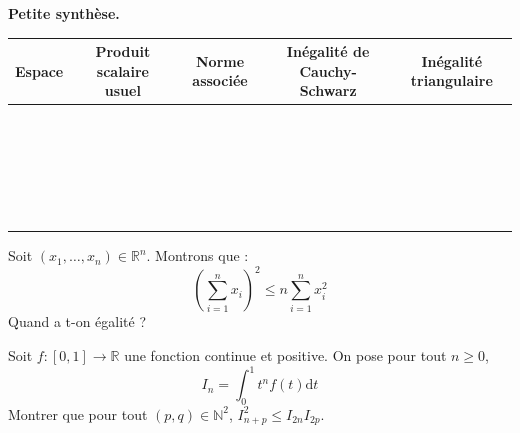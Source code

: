 \documentclass[french,11pt,twoside]{VcCours}
\newcommand{\dt}{\text{d}t}
\begin{document}
\begin{center}
\textbf{Petite synthèse.}
\end{center}

\begin{tabular}{|c|c|c|c|c|}
\hline
Espace & Produit scalaire usuel & Norme associée & Inégalité de Cauchy-Schwarz & Inégalité triangulaire \\
\hline
& & & & \\
& & & & \\
& & & & \\
& & & & \\
& & & & \\
& & & & \\
\hline
& & & & \\
& & & & \\
& & & & \\
& & & & \\
& & & & \\
& & & & \\
\hline
& & & & \\
& & & & \\
& & & & \\
& & & & \\
& & & & \\
& & & & \\
\hline
& & & & \\
& & & & \\
& & & & \\
& & & & \\
& & & & \\
& & & & \\
\hline
\end{tabular}



\begin{Exemple}{} Soit $(x_1, \ldots, x_n) \in \mathbb{R}^n$. Montrons que :
$$ \left(\sum_{i=1}^n x_i \right)^2 \leq n \sum_{i=1}^n x_i^2$$
Quand a t-on égalité ?


\end{Exemple}

\newpage

\begin{ApplicationDirecte}{} Soit $f : [0,1] \rightarrow \mathbb{R}$ une fonction continue et positive. On pose pour tout $n \geq 0$,
$$ I_n = \int_{0}^1 t^n f(t) \dt$$
Montrer que pour tout $(p,q) \in \mathbb{N}^2$,  $I_{n+p}^2 \leq I_{2n} I_{2p}$.
\end{ApplicationDirecte}
\end{document}
